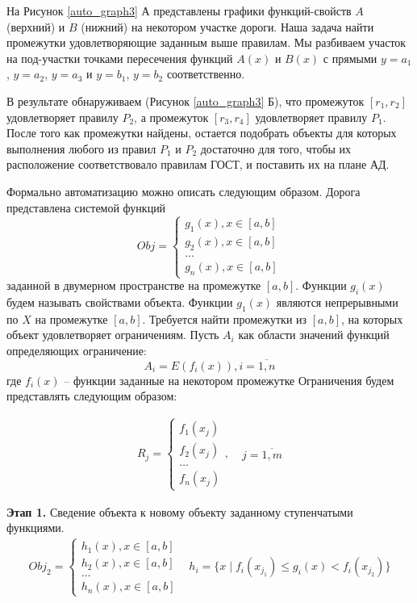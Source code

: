 На Рисунок \ref{auto_graph3} А представлены графики функций-свойств $A$ (верхний) и $B$ (нижний) на некотором участке дороги. Наша задача найти промежутки удовлетворяющие заданным выше правилам. Мы разбиваем участок на под-участки точками пересечения функций $A(x)$ и $B(x)$ с прямыми $y = a_1$, $y = a_2$, $y = a_3$ и $y = b_1$, $y = b_2$ соответственно. 

В результате обнаруживаем (Рисунок \ref{auto_graph3} Б), что промежуток $[r_1,r_2]$ удовлетворяет правилу $P_2$, а промежуток $[r_3,r_4]$ удовлетворяет правилу $P_1$. После того как промежутки найдены, остается подобрать объекты для которых выполнения любого из правил $P_1$ и $P_2$ достаточно для того, чтобы их расположение соответствовало правилам ГОСТ, и поставить их на плане АД. 

Формально автоматизацию можно описать следующим образом. Дорога представлена системой функций
$$
Obj = 
\begin{cases}
g_1(x), x \in [a, b] \\
g_2(x), x \in [a, b] \\
\dots \\
g_n(x), x \in [a, b]
\end{cases}
$$
\noindent
заданной в двумерном пространстве на промежутке $[a,b]$. Функции $g_i(x)$ будем называть свойствами объекта. Функции $g_1(x)$ являются непрерывными по $X$ на промежутке $[a,b]$. Требуется найти промежутки из $[a,b]$, на которых объект удовлетворяет ограничениям. Пусть $A_i$ как области значений функций определяющих ограничение:
$$
A_i = E(f_i(x)), i = \overline{1, n}
$$
где $f_i(x)$ -- функции заданные на некотором промежутке  Ограничения будем представлять следующим образом:

$$
\begin{aligned}
	R_j = \begin{cases}
	f_1(x_j) \\
	f_2(x_j) \\
	\dots \\
	f_n(x_j)
	\end{cases},\;
\end{aligned}
\begin{aligned}
j = \overline{1, m}
\end{aligned}
$$

\textbf{Этап 1.} Сведение объекта  к новому объекту заданному ступенчатыми функциями.
$$
\begin{aligned}
	Obj_2 = 
	\begin{cases}
		h_1(x), x \in [a, b] \\
		h_2(x), x \in [a, b] \\
		\dots \\
		h_n(x), x \in [a, b]
	\end{cases}
\end{aligned}
\begin{aligned}
h_i = \{x\;|\; f_i(x_{j_1}) \leq g_i(x) < f_i(x_{j_2}) \}
\end{aligned}
$$

